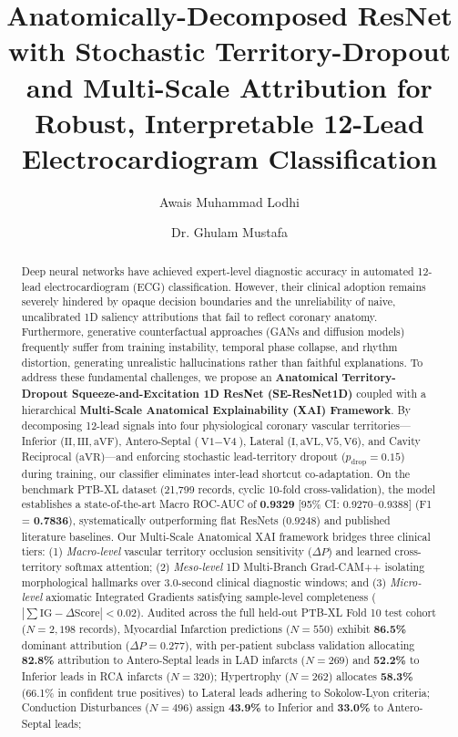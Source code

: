 \documentclass[5p,twocolumn,10pt]{elsarticle}
\begin{document}
\begin{frontmatter}

\title{Anatomically-Decomposed ResNet with Stochastic Territory-Dropout and Multi-Scale Attribution for Robust, Interpretable 12-Lead Electrocardiogram Classification}

\author[1]{Awais Muhammad Lodhi}
\author[1]{Dr. Ghulam Mustafa}

\address[1]{Department of Computer Science, FOIT\&CS, UCP, Pakistan}

\begin{abstract}
Deep neural networks have achieved expert-level diagnostic accuracy in automated 12-lead electrocardiogram (ECG) classification. However, their clinical adoption remains severely hindered by opaque decision boundaries and the unreliability of naive, uncalibrated 1D saliency attributions that fail to reflect coronary anatomy. Furthermore, generative counterfactual approaches (GANs and diffusion models) frequently suffer from training instability, temporal phase collapse, and rhythm distortion, generating unrealistic hallucinations rather than faithful explanations. To address these fundamental challenges, we propose an \textbf{Anatomical Territory-Dropout Squeeze-and-Excitation 1D ResNet (SE-ResNet1D)} coupled with a hierarchical \textbf{Multi-Scale Anatomical Explainability (XAI) Framework}. By decomposing 12-lead signals into four physiological coronary vascular territories---Inferior ($\text{II}, \text{III}, \text{aVF}$), Antero-Septal ($\text{V1}-\text{V4}$), Lateral ($\text{I}, \text{aVL}, \text{V5}, \text{V6}$), and Cavity Reciprocal ($\text{aVR}$)---and enforcing stochastic lead-territory dropout ($p_{\text{drop}} = 0.15$) during training, our classifier eliminates inter-lead shortcut co-adaptation. On the benchmark PTB-XL dataset (21,799 records, cyclic 10-fold cross-validation), the model establishes a state-of-the-art Macro ROC-AUC of \textbf{0.9329} [95\% CI: 0.9270--0.9388] (F1 = \textbf{0.7836}), systematically outperforming flat ResNets ($0.9248$) and published literature baselines. Our Multi-Scale Anatomical XAI framework bridges three clinical tiers: (1) \textit{Macro-level} vascular territory occlusion sensitivity ($\Delta P$) and learned cross-territory softmax attention; (2) \textit{Meso-level} 1D Multi-Branch Grad-CAM++ isolating morphological hallmarks over 3.0-second clinical diagnostic windows; and (3) \textit{Micro-level} axiomatic Integrated Gradients satisfying sample-level completeness ($|\sum \text{IG} - \Delta \text{Score}| < 0.02$). Audited across the full held-out PTB-XL Fold 10 test cohort ($N = 2,198$ records), Myocardial Infarction predictions ($N=550$) exhibit \textbf{86.5\%} dominant attribution ($\Delta P = 0.277$), with per-patient subclass validation allocating \textbf{82.8\%} attribution to Antero-Septal leads in LAD infarcts ($N=269$) and \textbf{52.2\%} to Inferior leads in RCA infarcts ($N=320$); Hypertrophy ($N=262$) allocates \textbf{58.3\%} (66.1\% in confident true positives) to Lateral leads adhering to Sokolow-Lyon criteria; Conduction Disturbances ($N=496$) assign \textbf{43.9\%} to Inferior and \textbf{33.0\%} to Antero-Septal leads; 
\end{abstract}
\end{frontmatter}
\end{document}
